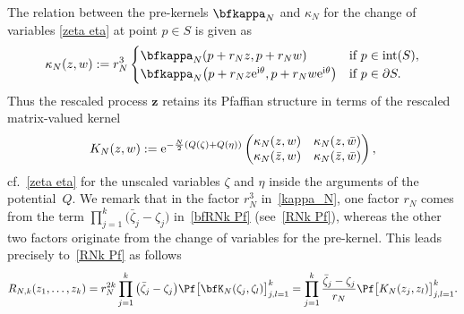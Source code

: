 The relation between the pre-kernels $\bfkappa_N$ and $\kappa_N$
for the change of variables \eqref{zeta eta}
at point $p\in S$ is given as
\begin{gather} \label{kappa_N}
	\kappa_N(z,w):=r_N^3
	\begin{cases}
		\bfkappa_N( p+r_Nz, p+r_Nw) &\text{if } p \in \textup{int}(S),
		\\
	\bfkappa_N\big( p+r_Nz {\rm e}^{{\rm i}\theta}, p+r_Nw {\rm e}^{{\rm i}\theta} \big)&\text{if } p \in \partial S.
	\end{cases} 	
\end{gather}
Thus the rescaled process $\boldsymbol{z}$ retains its Pfaffian structure in terms of the rescaled matrix-valued kernel
\begin{gather} \label{K_N}
	K_N(z,w):={\rm e}^{ -\frac{N}{2} (Q( \zeta )+Q( \eta )) } \begin{pmatrix}
		\kappa_N(z,w) & \kappa_N(z,\bar{w}) \\
		\kappa_N(\bar{z},w) & \kappa_N(\bar{z},\bar{w})
	\end{pmatrix},
\end{gather}
cf.~\eqref{zeta eta} for the unscaled variables $\zeta$ and $\eta$ inside the arguments of the potential~$Q$. We remark that in the factor $r_N^3$ in~\eqref{kappa_N}, one factor $r_N$ comes from the term $\prod_{j=1}^k \big(\bar{\zeta}_j-\zeta_j\big)$ in~\eqref{bfRNk Pf} (see~\eqref{RNk Pf}), whereas the other two factors originate from the change of variables for the pre-kernel. This leads precisely to~\eqref{RNk Pf} as follows
	\begin{gather*}
		 R_{N,k}(z_1,\dots, z_k)
		 = 	r_N^{2k} \prod_{j=1}^{k} \big(\bar{\zeta}_j-\zeta_j\big) \Pf \big[ \bfK_{N}(\zeta_j,\zeta_l) \big]_{ j,l=1 }^k
		= \prod_{j=1}^{k} \frac{\bar{\zeta}_j-\zeta_j}{r_N} \Pf \big[ K_{N}(z_j,z_l) \big]_{ j,l=1 }^k.
	\end{gather*}
